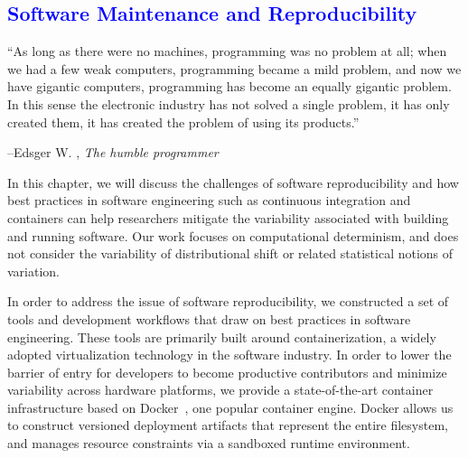 \documentclass[12pt,initial,twoside,maitrise]{dms}
\newcommand{\mediumwell}[1]{\textcolor{blue}{#1}}
\numberwithin{equation}{section}
\numberwithin{table}{chapter}
\numberwithin{figure}{chapter}
\begin{document}



\mediumwell{\chapter{Software Maintenance and Reproducibility}\label{ch:ducker}}

\setlength{\epigraphwidth}{0.80\textwidth}
\epigraph{``As long as there were no machines, programming was no problem at all; when we had a few weak computers, programming became a mild problem, and now we have gigantic computers, programming has become an equally gigantic problem. In this sense the electronic industry has not solved a single problem, it has only created them, it has created the problem of using its products.''}{\begin{flushright}--Edsger W. \citet{dijkstra1972humble}, \textit{The humble programmer}\end{flushright}}

In this chapter, we will discuss the challenges of software reproducibility and how best practices in software engineering such as continuous integration and containers can help researchers mitigate the variability associated with building and running software. Our work focuses on computational determinism, and does not consider the variability of distributional shift or related statistical notions of variation.

In order to address the issue of software reproducibility, we constructed a set of tools and development workflows that draw on best practices in software engineering. These tools are primarily built around containerization, a widely adopted virtualization technology in the software industry. In order to lower the barrier of entry for developers to become productive contributors and minimize variability across hardware platforms, we provide a state-of-the-art container infrastructure based on Docker~\citep{merkel2014docker}, one popular container engine. Docker allows us to construct versioned deployment artifacts that represent the entire filesystem, and manages resource constraints via a sandboxed runtime environment.
\end{document}
